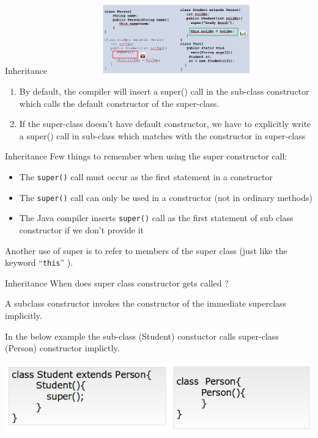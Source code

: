 \documentclass[14pt]{beamer}
\begin{document}
\begin{frame}{Inheritance}
 \includegraphics[height=3cm, width=11cm]{super-example.png}
 \begin{enumerate}
  \item By default, the compiler will insert a super() call in the sub-class constructor which calls the default constructor of the super-class. 
  \item If the super-class doesn’t have default constructor, we have to explicitly write a super() call in sub-class which matches with the constructor in super-class
 \end{enumerate}

\end{frame}

\begin{frame}{Inheritance}
Few things to remember when using the super constructor call: 
\begin{itemize}
 \item The \lstinline!super()! call must occur as the first statement in a constructor
 \item The \lstinline!super()! call can only be used in a constructor (not in ordinary methods)
 \item The Java compiler inserts \lstinline!super()! call as the first statement of sub class constructor if we don't provide it
\end{itemize}
Another use of super is to refer to members of the super class (just like the keyword ``\lstinline!this!'' ).
\end{frame}



\begin{frame}{Inheritance}
 When does super class constructor gets called ? 
 
 A subclass constructor invokes the constructor of the immediate superclass implicitly.
 
 In the below example the sub-class (Student) constuctor calls super-class (Person) constructor implictly.
 
 \includegraphics[scale=.5]{super-call.png}
\end{frame}
\end{document}
